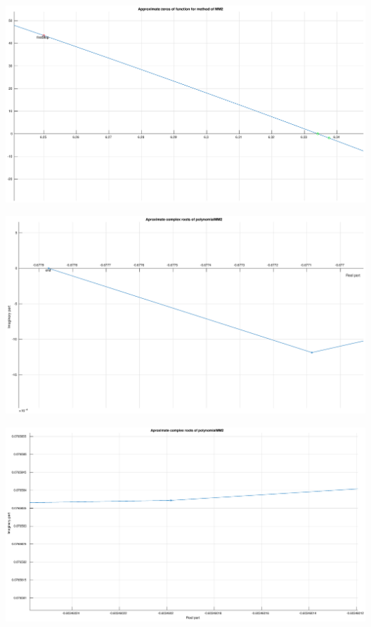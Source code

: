 \documentclass[12pt]{report}
\begin{document}
\begin{center}
   \includegraphics[scale=0.25]{task2mm2zommedright.eps}
\end{center}

\begin{center}
   \includegraphics[scale=0.25]{task2mm2complexzommedleft.eps}
\end{center}

\begin{center}
   \includegraphics[scale=0.25]{task2mm2complexzommedmiddle.eps}
\end{center}
\end{document}
